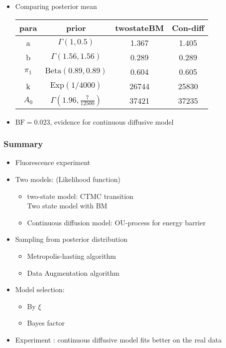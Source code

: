 \documentclass[11pt]{beamer}
\newcommand{\bit}{\begin{itemize}\setlength{\itemsep}{0cm}\setlength{\topsep}{0cm}}
\newcommand{\eit}{\end{itemize}}
\begin{document}
\begin{frame}
\bit
\item Comparing posterior mean

{\small
	\begin{table}
	\begin{tabular}{cccc}
	\toprule
			para& prior & twostateBM &	Con-diff  \\ \midrule
			a& $\Gamma(1,0.5)$ & 1.367 & 1.405 \\
			b& $\Gamma(1.56,1.56)$ & 0.289 &  0.289 \\
			$\pi_1$ &  $\mbox{Beta}(0.89,0.89)$ & 0.604 & 0.605   \\	
			k& $\mbox{Exp}(1/4000)$ & 26744  &25830 \\
			$A_0$ & $\Gamma(1.96,\frac{7}{12500})$ & 37421 & 37235 \\ 
			\bottomrule
			\end{tabular}
	\end{table}
	}
	\item $\mbox{BF} = 0.023$, evidence for continuous diffusive model
	\eit
\end{frame}
\begin{frame}
	\frametitle{Summary}
	\bit
	\item Fluorescence experiment
	\item Two models: (Likelihood function)
	\bit
	\item two-state model: CTMC transition\\
	Two state model with BM
	\item Continuous diffusion model: OU-process for energy barrier
	\eit
	\item Sampling from posterior distribution
	\bit
	\item Metropolis-hasting algorithm
	\item Data Augmentation algorithm
	\eit
	\item Model selection: 
	\bit 
	\item By $\xi$
	\item Bayes factor
	\eit
	\item Experiment : continuous diffusive model fits better on the real data
	\eit
\end{frame}
\end{document}
